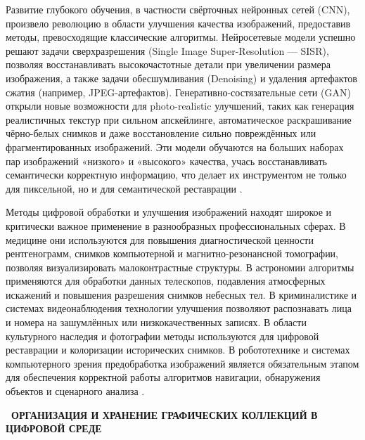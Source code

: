 \documentclass{SibFU-docs}
\begin{document}
Развитие глубокого обучения, в частности свёрточных нейронных сетей (CNN), произвело революцию в области улучшения качества изображений, предоставив методы, превосходящие классические алгоритмы. Нейросетевые модели успешно решают задачи сверхразрешения (Single Image Super-Resolution — SISR), позволяя восстанавливать высокочастотные детали при увеличении размера изображения, а также задачи обесшумливания (Denoising) и удаления артефактов сжатия (например, JPEG-артефактов). Генеративно-состязательные сети (GAN) открыли новые возможности для photo-realistic улучшений, таких как генерация реалистичных текстур при сильном апскейлинге, автоматическое раскрашивание чёрно-белых снимков и даже восстановление сильно повреждённых или фрагментированных изображений. Эти модели обучаются на больших наборах пар изображений «низкого» и «высокого» качества, учась восстанавливать семантически корректную информацию, что делает их инструментом не только для пиксельной, но и для семантической реставрации \cite{learnopencv2023ai}.


Методы цифровой обработки и улучшения изображений находят широкое и критически важное применение в разнообразных профессиональных сферах. В медицине они используются для повышения диагностической ценности рентгенограмм, снимков компьютерной и магнитно-резонансной томографии, позволяя визуализировать малоконтрастные структуры. В астрономии алгоритмы применяются для обработки данных телескопов, подавления атмосферных искажений и повышения разрешения снимков небесных тел. В криминалистике и системах видеонаблюдения технологии улучшения позволяют распознавать лица и номера на зашумлённых или низкокачественных записях. В области культурного наследия и фотографии методы используются для цифровой реставрации и колоризации исторических снимков. В робототехнике и системах компьютерного зрения предобработка изображений является обязательным этапом для обеспечения корректной работы алгоритмов навигации, обнаружения объектов и сценарного анализа \cite{gonzalez2018digital}.



\newpage
{}
\begin{center}\textbf{\thesection\ ОРГАНИЗАЦИЯ И ХРАНЕНИЕ ГРАФИЧЕСКИХ КОЛЛЕКЦИЙ В ЦИФРОВОЙ СРЕДЕ}\end{center}
\vspace*{-1.5em}
\end{document}
